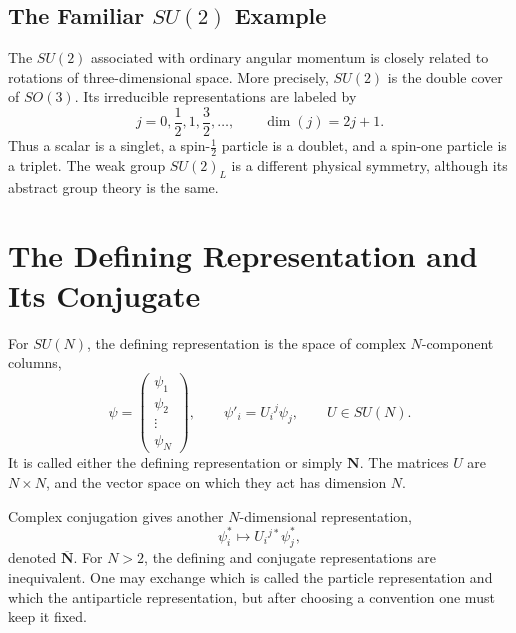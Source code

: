 \subsection{The Familiar \texorpdfstring{\(SU(2)\)}{SU(2)} Example}

The \(SU(2)\) associated with ordinary angular momentum is closely related to rotations of three-dimensional space. More precisely, \(SU(2)\) is the double cover of \(SO(3)\). Its irreducible representations are labeled by
\begin{equation}
j=0,\frac12,1,\frac32,\ldots,
\qquad
\dim(j)=2j+1.
\label{eq:l10-su2-spins}
\end{equation}
Thus a scalar is a singlet, a spin-\(\tfrac12\) particle is a doublet, and a spin-one particle is a triplet. The weak group \(SU(2)_L\) is a different physical symmetry, although its abstract group theory is the same.

\section{The Defining Representation and Its Conjugate}

For \(SU(N)\), the defining representation is the space of complex \(N\)-component columns,
\begin{equation}
\psi=
\begin{pmatrix}
\psi_1\\
\psi_2\\
\vdots\\
\psi_N
\end{pmatrix},
\qquad
\psi'_i=U_i{}^j\psi_j,
\qquad
U\in SU(N).
\label{eq:l10-defining}
\end{equation}
It is called either the defining representation or simply \(\mathbf N\). The matrices \(U\) are \(N\times N\), and the vector space on which they act has dimension \(N\).

Complex conjugation gives another \(N\)-dimensional representation,
\begin{equation}
\psi_i^*\longmapsto U_i{}^{j*}\psi_j^*,
\label{eq:l10-conjugate}
\end{equation}
denoted \(\overline{\mathbf N}\). For \(N>2\), the defining and conjugate representations are inequivalent. One may exchange which is called the particle representation and which the antiparticle representation, but after choosing a convention one must keep it fixed.

\begin{classroomqa}
\end{classroomqa}


